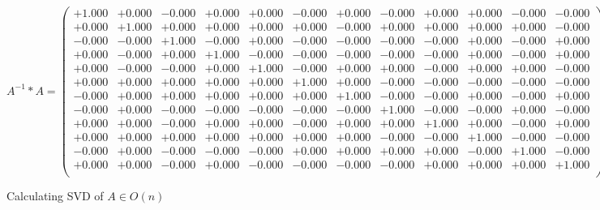 \documentclass[9pt]{article}
\theoremstyle{plain}
\theoremstyle{definition}
\theoremstyle{remark}
\numberwithin{equation}{section}
\begin{document}
$A^{-1} *A = \left(
\begin{array}{
cccccccccccc}
+1.000 & +0.000 & -0.000 & +0.000 & +0.000 & -0.000 & +0.000 & -0.000 & +0.000 & +0.000 & -0.000 & -0.000 \\
+0.000 & +1.000 & +0.000 & +0.000 & +0.000 & +0.000 & -0.000 & +0.000 & +0.000 & +0.000 & +0.000 & -0.000 \\
-0.000 & -0.000 & +1.000 & -0.000 & +0.000 & -0.000 & -0.000 & -0.000 & -0.000 & +0.000 & -0.000 & +0.000 \\
+0.000 & -0.000 & +0.000 & +1.000 & -0.000 & -0.000 & -0.000 & -0.000 & -0.000 & +0.000 & -0.000 & +0.000 \\
+0.000 & -0.000 & -0.000 & +0.000 & +1.000 & -0.000 & +0.000 & +0.000 & -0.000 & +0.000 & +0.000 & -0.000 \\
+0.000 & +0.000 & +0.000 & +0.000 & +0.000 & +1.000 & +0.000 & -0.000 & -0.000 & -0.000 & -0.000 & -0.000 \\
-0.000 & +0.000 & +0.000 & +0.000 & +0.000 & +0.000 & +1.000 & -0.000 & -0.000 & +0.000 & -0.000 & +0.000 \\
-0.000 & +0.000 & -0.000 & -0.000 & -0.000 & -0.000 & -0.000 & +1.000 & -0.000 & -0.000 & +0.000 & -0.000 \\
+0.000 & +0.000 & -0.000 & +0.000 & +0.000 & -0.000 & +0.000 & +0.000 & +1.000 & +0.000 & -0.000 & +0.000 \\
+0.000 & +0.000 & +0.000 & +0.000 & +0.000 & +0.000 & +0.000 & -0.000 & -0.000 & +1.000 & -0.000 & -0.000 \\
-0.000 & +0.000 & -0.000 & -0.000 & -0.000 & +0.000 & +0.000 & +0.000 & +0.000 & -0.000 & +1.000 & -0.000 \\
+0.000 & +0.000 & -0.000 & +0.000 & -0.000 & -0.000 & -0.000 & -0.000 & +0.000 & +0.000 & +0.000 & +1.000 \\
\end{array}
\right)$ \newline 

Calculating SVD of  $A \in O(n)$
\end{document}
